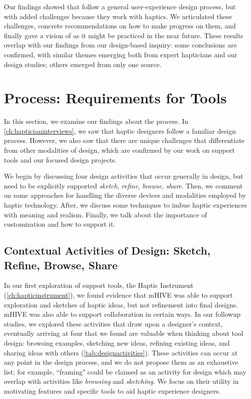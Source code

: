 Our findings showed that  follow a general user-experience design process, but with added challenges because they work with haptics.
We articulated these challenges,  concrete recommendations on how to make progress on them, and finally gave a vision of \revFinal{\haxd} as it might be practiced in the near future.
These results overlap with our findings from our design-based inquiry: some conclusions are confirmed, with similar themes emerging both from expert hapticians and our design studies; others emerged from only one source.


%
%
\section{\haxd Process: Requirements for Tools}
In this section, we examine our findings about the \haxd process. %
In \autoref{ch:hapticianinterviews}, we saw that haptic designers follow a familiar design process.
However, we also saw that there are unique challenges that differentiate \haxd from other modalities of design, which are confirmed by our work on \haxd support tools and our focused design projects.

We begin by discussing four design activities that occur generally in design, but need to be explicitly supported  \emph{sketch}, \emph{refine}, \emph{browse}, \emph{share}.
Then, we comment on some approaches for handling the diverse devices and modalities employed by haptic technology.
After, we discuss some techniques to imbue haptic experiences with meaning and realism.
Finally, we talk about the importance of customization and how to support it.

\subsection{Contextual Activities of Design: Sketch, Refine, Browse, Share}
In our first exploration of \haxd support tools, the Haptic Instrument (\autoref{ch:hapticinstrument}), we found evidence that mHIVE was able to support exploration and sketches of haptic ideas, but not refinement into final designs.
mHIVE was also able to support collaboration in certain ways.
In our followup studies, we explored these activities that draw upon a designer's context, eventually arriving at four that we found are valuable when thinking about tool design: browsing examples, sketching new ideas, refining existing ideas, and sharing ideas with others (\autoref{tab:designactivities}).
These activities can occur at any point in the design process, and we do not propose them as an exhaustive list; for example, ``framing" \cite{Schon1982,Warr2005} could be claimed as an activity for design which may overlap with activities like \emph{browsing} and \emph{sketching}.
We focus on their utility in motivating features and specific tools to aid haptic experience designers.




